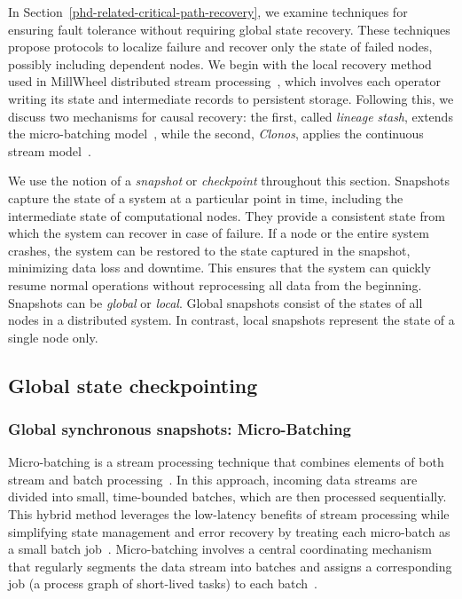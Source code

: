 In Section~\ref{phd-related-critical-path-recovery}, we examine techniques for ensuring fault tolerance without requiring global state recovery. These techniques propose protocols to localize failure and recover only the state of failed nodes, possibly including dependent nodes. We begin with the local recovery method used in MillWheel distributed stream processing~\cite{Akidau:2013:MFS:2536222.2536229}, which involves each operator writing its state and intermediate records to persistent storage. Following this, we discuss two mechanisms for causal recovery: the first, called {\em lineage stash}, extends the micro-batching model~\cite{Wang:2019:LSF:3341301.3359653}, while the second, {\em Clonos}, applies the continuous stream model~\cite{silvestre2021clonos}.

We use the notion of a {\em snapshot} or {\em checkpoint} throughout this section. Snapshots capture the state of a system at a particular point in time, including the intermediate state of computational nodes. They provide a consistent state from which the system can recover in case of failure. If a node or the entire system crashes, the system can be restored to the state captured in the snapshot, minimizing data loss and downtime. This ensures that the system can quickly resume normal operations without reprocessing all data from the beginning. Snapshots can be {\em global} or {\em local}. Global snapshots consist of the states of all nodes in a distributed system. In contrast, local snapshots represent the state of a single node only.

\subsection{Global state checkpointing}
\label{phd-related-global-state-checkpointing}

\subsubsection{Global synchronous snapshots: Micro-Batching}

Micro-batching is a stream processing technique that combines elements of both stream and batch processing~\cite{Zaharia:2012:DSE:2342763.2342773, zaharia2010spark}. In this approach, incoming data streams are divided into small, time-bounded batches, which are then processed sequentially. This hybrid method leverages the low-latency benefits of stream processing while simplifying state management and error recovery by treating each micro-batch as a small batch job~\cite{garcia2023micro}. Micro-batching involves a central coordinating mechanism that regularly segments the data stream into batches and assigns a corresponding job (a process graph of short-lived tasks) to each batch~\cite{Zaharia:2012:DSE:2342763.2342773}.

